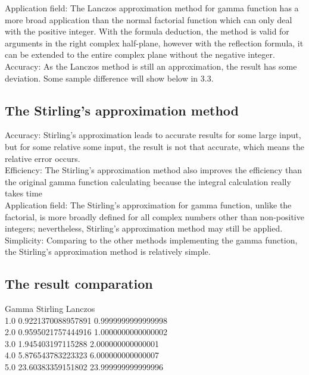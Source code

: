 \documentclass[a4paper, 11pt]{article}
\begin{document}
Application field: The Lanczos approximation method for gamma function has a more broad application than the normal factorial function which can only deal with the positive integer. With the formula deduction, the method is valid for arguments in the right complex half-plane, however with the  reflection formula, it can be extended to the entire complex plane without the negative integer.\\

Accuracy: As the Lanczos method is still an approximation, the result has some deviation. Some sample difference will show below in 3.3.

\subsection{ The Stirling's approximation method}
\indent\indent Accuracy: Stirling's approximation leads to accurate results for some large input, but for some relative some input, the result is not that accurate, which means the relative error occurs.\\

Efficiency: The Stirling's approximation method also improves the efficiency than the original gamma function calculating because the integral calculation really takes time \\

Application field: The Stirling's approximation for gamma function, unlike the factorial, is more broadly defined for all complex numbers other than non-positive integers; nevertheless, Stirling's approximation method may still be applied.\\

Simplicity: Comparing to the other methods implementing the gamma function, the Stirling's approximation method is relatively simple.

\subsection{The result comparation}
Gamma \hspace{3cm}		Stirling \hspace{3cm}	Lanczos\\
1.0	\hspace{3cm}	0.9221370088957891\hspace{1cm}	0.9999999999999998\\
2.0	\hspace{3cm}	0.9595021757444916\hspace{1cm}	1.0000000000000002\\
3.0	\hspace{3cm}	1.945403197115288 \hspace{1cm}	2.000000000000001\\
4.0	\hspace{3cm}	5.876543783223323 \hspace{1cm}	6.000000000000007\\
5.0	\hspace{3cm}	23.60383359151802 \hspace{1cm}	23.999999999999996
\end{document}
